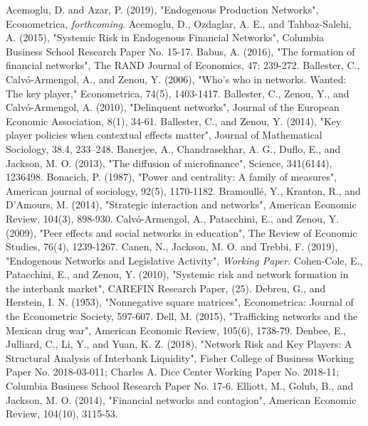 \documentclass[12pt]{article}
\theoremstyle{definition}
\begin{document}
\begin{thebibliography}{99}
\bibitem{}{}
	Acemoglu, D. and Azar, P. (2019),
	"Endogenous Production Networks",{}
	Econometrica, \textit{forthcoming}.
\bibitem{}
	Acemoglu, D., Ozdaglar, A. E., and Tahbaz-Salehi, A. (2015),
	"Systemic Risk in Endogenous Financial Networks",
	Columbia Business School Research Paper No. 15-17.
\bibitem{}
	Babus, A. (2016),
	"The formation of financial networks",
	The RAND Journal of Economics, 47: 239-272.
	Ballester, C., Calv\'{o}‐Armengol, A., and Zenou, Y. (2006),
	"Who's who in networks. Wanted: The key player,"
	Econometrica, 74(5), 1403-1417.
	Ballester, C., Zenou, Y., and Calv\'{o}-Armengol, A. (2010),
	"Delinquent networks",
	Journal of the European Economic Association, 8(1), 34-61.
	Ballester, C., and Zenou, Y. (2014),
	"Key player policies when contextual effects matter",
	Journal of Mathematical Sociology, 38.4, 233–248.
\bibitem{}
	Banerjee, A., Chandrasekhar, A. G., Duflo, E., and Jackson, M. O. (2013),
	"The diffusion of microfinance",
	Science, 341(6144), 1236498.
	Bonacich, P. (1987),
	"Power and centrality: A family of measures",
	American journal of sociology, 92(5), 1170-1182.
\bibitem{}
	Bramoull\'{e}, Y., Kranton, R., and D'Amours, M. (2014),
	"Strategic interaction and networks",
	American Economic Review, 104(3), 898-930.
\bibitem{}
	Calv\'{o}-Armengol, A., Patacchini, E., and Zenou, Y. (2009),
	"Peer effects and social networks in education",
	The Review of Economic Studies, 76(4), 1239-1267.
\bibitem{}
	Canen, N., Jackson, M. O. and Trebbi, F. (2019),
	"Endogenous Networks and Legislative Activity",
	\textit{Working Paper}.
\bibitem{}
	Cohen-Cole, E., Patacchini, E., and Zenou, Y. (2010),
	"Systemic risk and network formation in the interbank market",
	CAREFIN Research Paper, (25).
	Debreu, G., and Herstein, I. N. (1953),
	"Nonnegative square matrices",
	Econometrica: Journal of the Econometric Society, 597-607.
\bibitem{}
	Dell, M. (2015),
	"Trafficking networks and the Mexican drug war",
	American Economic Review, 105(6), 1738-79.
\bibitem{}
	Denbee, E., Julliard, C., Li, Y., and Yuan, K. Z. (2018),
	"Network Risk and Key Players: A Structural Analysis of Interbank Liquidity",
	Fisher College of Business Working Paper No. 2018-03-011;
	Charles A. Dice Center Working Paper No. 2018-11;
	Columbia Business School Research Paper No. 17-6. 
	Elliott, M., Golub, B., and Jackson, M. O. (2014),
	"Financial networks and contagion",
	American Economic Review, 104(10), 3115-53.

\end{thebibliography}
\end{document}
